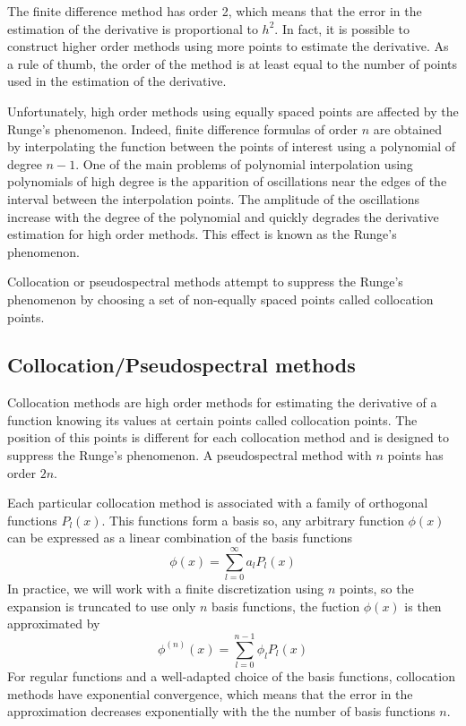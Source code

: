 The finite difference method has order 2, which means that the error in the estimation of
the derivative is proportional to $h^2$. In fact, it is possible to construct higher order methods
using more points to estimate the derivative. As a rule of thumb, the order of the method
is at least equal to the number of points used in the estimation of the derivative.

Unfortunately, high order methods using equally spaced points are affected by the Runge's phenomenon. 
Indeed, finite difference formulas of order $n$ are obtained by interpolating the function between 
the points of interest using a polynomial of degree $n-1$. One of the main problems of polynomial
interpolation using polynomials of high degree is the apparition of oscillations near the edges of the 
interval between the interpolation points. The amplitude of the oscillations increase with the degree 
of the polynomial and quickly degrades the derivative estimation for high order methods.
 This effect is known as the Runge's phenomenon.

Collocation or pseudospectral methods attempt to suppress the Runge's phenomenon by choosing a set of
non-equally spaced points called collocation points. 

\subsection{Collocation/Pseudospectral methods}

Collocation methods are high order methods for estimating the derivative of a function knowing its 
values at certain points called collocation points. The position of this points is different for each
collocation method and is designed to suppress the Runge's phenomenon. A pseudospectral method
with $n$ points has order $2n$.

Each particular collocation method is associated with a family of orthogonal functions $P_l(x)$.
This functions form a basis so, any arbitrary function $\phi(x)$ can be expressed as a linear
combination of the basis functions
$$\phi(x)=\sum_{l=0}^{\infty}a_lP_l(x)$$
In practice, we will work with a finite discretization using $n$ points, so the expansion is truncated
to use only $n$ basis functions, the fuction $\phi(x)$ is then approximated by
$$\phi^{(n)}(x)=\sum_{l=0}^{n-1}\phi_lP_l(x)$$
For regular functions and a well-adapted choice of the basis functions, collocation methods have
exponential convergence, which means that the error in the approximation decreases exponentially
with the the number of basis functions $n$.

